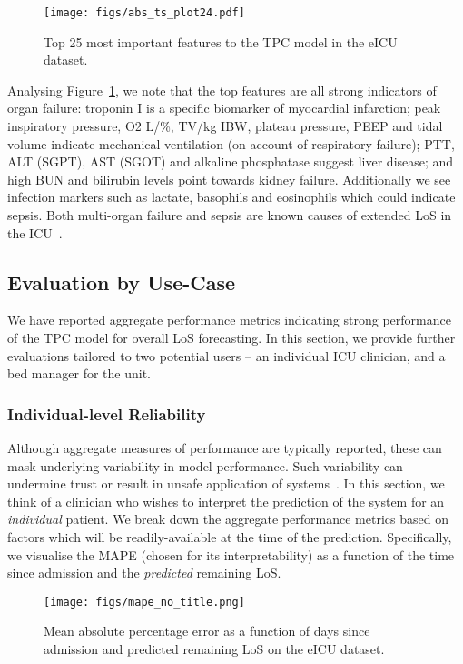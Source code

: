 \documentclass[sigconf]{acmart}
\begin{document}
\label{sec:featimportance}
\begin{figure}[h]
  \centering
  \hspace{-0.7em}
  \texttt{[image: figs/abs\_ts\_plot24.pdf]}
  \caption{Top 25 most important features to the TPC model in the eICU dataset.}
    \label{fig:featureattr}
\end{figure}

Analysing Figure~\ref{fig:featureattr}, we note that the top features are all strong indicators of organ failure: troponin I is a specific biomarker of myocardial infarction; peak inspiratory pressure, O2 L/\%, TV/kg IBW, plateau pressure, PEEP and tidal volume indicate mechanical ventilation (on account of respiratory failure); PTT, ALT (SGPT), AST (SGOT) and alkaline phosphatase suggest liver disease; and high BUN and bilirubin levels point towards kidney failure. Additionally we see infection markers such as lactate, basophils and eosinophils which could indicate sepsis. Both multi-organ failure and sepsis are known causes of extended LoS in the ICU~\citep{Bohmer2014}.

\subsection{Evaluation by Use-Case}
We have reported aggregate performance metrics indicating strong performance of the TPC model for overall LoS forecasting. In this section, we provide further evaluations tailored to two potential users -- an individual ICU clinician, and a bed manager for the unit.

\subsubsection{Individual-level Reliability}

Although aggregate measures of performance are typically reported, these can mask underlying variability in model performance. Such variability can undermine trust or result in unsafe application of systems~\cite{Sendak2020}. In this section, we think of a clinician who wishes to interpret the prediction of the system for an \emph{individual} patient. We break down the aggregate performance metrics based on factors which will be readily-available at the time of the prediction. Specifically, we visualise the MAPE (chosen for its interpretability) as a function of the time since admission and the \emph{predicted} remaining LoS.

\begin{figure}[h]
  \centering
\texttt{[image: figs/mape\_no\_title.png]}
  \caption{Mean absolute percentage error as a function of days since admission and predicted remaining LoS on the eICU dataset.}
    \label{fig:reliability}
\end{figure}
\end{document}
